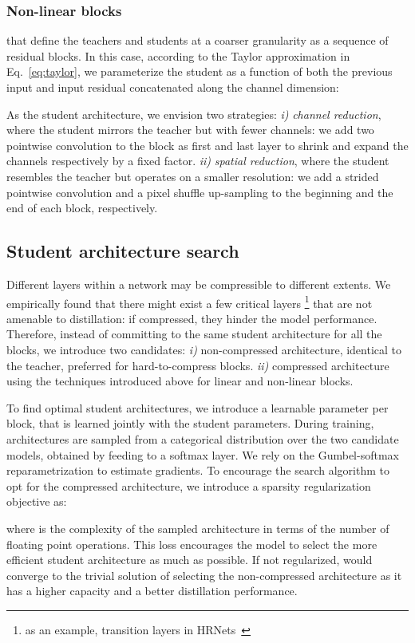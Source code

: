 \documentclass[runningheads]{llncs}
\begin{document}
\subsubsection{Non-linear blocks} that define the teachers and students at a coarser granularity as a sequence of residual blocks. In this case, according to the Taylor approximation in Eq.~\ref{eq:taylor}, we parameterize the student as a function of both the previous input  and input residual  concatenated along the channel dimension:

As the student architecture, we envision two strategies: \textit{i)} \textit{channel reduction}, where the student mirrors the teacher but with fewer channels: we add two pointwise convolution to the block as first and last layer to shrink and expand the channels respectively by a fixed factor. \textit{ii)} \textit{spatial reduction}, where the student resembles the teacher but operates on a smaller resolution: we add a strided pointwise convolution and a pixel shuffle up-sampling to the beginning and the end of each block, respectively.
\subsection{Student architecture search}
Different layers within a network may be compressible to different extents.
We empirically found that there might exist a few critical layers
\footnote{as an example, transition layers in HRNets~\cite{hrnet}} 
that are not amenable to distillation: if compressed, they hinder the model performance.
Therefore, instead of committing to the same student architecture for all the blocks, we introduce two candidates: \textit{i)} non-compressed architecture, identical to the teacher, preferred for hard-to-compress blocks. \textit{ii)} compressed architecture using the techniques introduced above for linear and non-linear blocks.

To find optimal student architectures, we introduce a learnable parameter  per block, that is learned jointly with the student parameters. During training, architectures are sampled from a categorical distribution  over the two candidate models, obtained by feeding  to a softmax layer. We rely on the Gumbel-softmax~\cite{jang2016categorical,maddison2016concrete} reparametrization to estimate gradients.
To encourage the search algorithm to opt for the compressed architecture, we introduce a sparsity regularization objective as:

where  is the complexity of the sampled architecture  in terms of the number of floating point operations. This loss encourages the model to select the more efficient student architecture as much as possible.
If not regularized,  would converge to the trivial solution of selecting the non-compressed architecture as it has a higher capacity and a better distillation performance.
\end{document}
